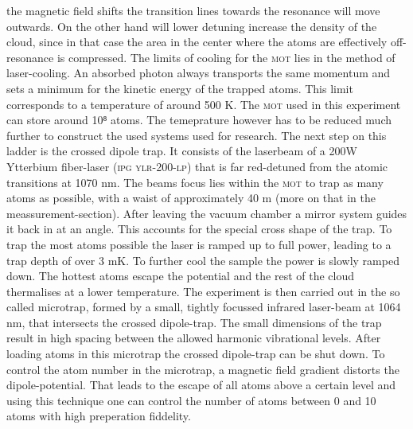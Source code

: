 the magnetic field shifts the transition lines towards the resonance will move outwards. On the other hand will lower detuning increase the density of the cloud, since in that case the area in the center where the atoms are effectively off-resonance is compressed. The limits of cooling for the \textsc{mot} lies in the method of laser-cooling. An absorbed photon always transports the same momentum and sets a minimum for the kinetic energy of the trapped atoms. This limit corresponds to a temperature of around 500 \mu K. The \textsc{mot} used in this experiment can store around 10⁸ atoms. The temeprature however has to be reduced much further to construct the used systems used for research. The next step on this ladder is the crossed dipole trap. It consists of the laserbeam of a 200W Ytterbium fiber-laser (\textsc{ipg ylr-200-lp}) that is far red-detuned from the atomic transitions at 1070 nm. The beams focus lies within the \textsc{mot} to trap as many atoms as possible, with a waist of approximately 40 \mu m (more on that in the meassurement-section). After leaving the vacuum chamber a mirror system guides it back in at an angle. This accounts for the special cross shape of the trap. To trap the most atoms possible the laser is ramped up to full power, leading to a trap depth of over 3 mK. To further cool the sample the power is slowly ramped down. The hottest atoms escape the potential and the rest of the cloud thermalises at a lower temperature. The experiment is then carried out in the so called microtrap, formed by a small, tightly focussed infrared laser-beam at 1064 nm, that intersects the crossed dipole-trap. The small dimensions of the trap result in high spacing between the allowed harmonic vibrational levels. After loading atoms in this microtrap the crossed dipole-trap can be shut down. To control the atom number in the microtrap, a magnetic field gradient distorts the dipole-potential. That leads to the escape of all atoms above a certain level and using this technique one can control the number of atoms between 0 and 10 atoms with high preperation fiddelity.
